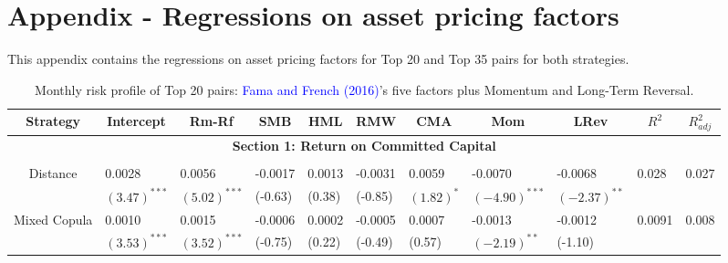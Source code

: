 	\section*{Appendix - Regressions on asset pricing factors}
	
	\vspace{0.6cm}
	
	\setcounter{table}{0}
	\renewcommand{\thetable}{A.\arabic{table}}
	
	
	This appendix contains the regressions on asset pricing factors for Top 20 and Top 35 pairs for both strategies.
	
	\vspace{1.0cm}
	

		\begin{table}[!ht]
		\centering \scriptsize
		\caption{Monthly risk profile of Top 20 pairs: \textcolor{blue}{Fama and French} \textcolor{blue}{(2016)}'s five factors plus Momentum and Long-Term Reversal.}
		\begin{threeparttable}[H]
			\begin{tabularx}{\textwidth}{@{\extracolsep{\fill}} lllllllllll@{}}
				\toprule
				\multicolumn{1}{c}{Strategy} & \multicolumn{1}{c}{Intercept} &  \multicolumn{1}{c}{Rm-Rf} &  \multicolumn{1}{c}{SMB} &  \multicolumn{1}{c}{HML} &  \multicolumn{1}{c}{RMW} &  \multicolumn{1}{c}{CMA} & 
				\multicolumn{1}{c}{Mom} &  \multicolumn{1}{c}{LRev} &  \multicolumn{1}{c}{$R^{2}$} & \multicolumn{1}{c}{$R^{2}_{adj}$} \\
				\midrule
				\multicolumn{11}{c}{\textbf{Section 1: Return on Committed Capital}} \\
				\multicolumn{1}{c}{} & \multicolumn{1}{c}{} & \multicolumn{1}{c}{} & \multicolumn{1}{c}{} & \multicolumn{1}{c}{} & \multicolumn{1}{c}{} & \multicolumn{1}{c}{} & \multicolumn{1}{c}{} & \multicolumn{1}{c}{} & \multicolumn{1}{c}{} & \\
				\multicolumn{1}{c}{Distance} & 0.0028 & 0.0056 & -0.0017 & 0.0013 & -0.0031 & 0.0059 & -0.0070 & -0.0068 & 0.028 & 0.027 \\
				\multicolumn{1}{c}{} & $(3.47)^{***}$ & $(5.02)^{***}$ & (-0.63) & (0.38) & (-0.85) & $(1.82)^{*}$ & $(-4.90)^{***}$ & $(-2.37)^{**}$ & & \\
				\multicolumn{1}{c}{Mixed Copula} & 0.0010 & 0.0015 & -0.0006 & 0.0002 & -0.0005 & 0.0007 & -0.0013 & -0.0012 & 0.0091 & 0.008 \\
				\multicolumn{1}{c}{} & $(3.53)^{***}$ & $(3.52)^{***}$ & (-0.75) & (0.22) & (-0.49) & (0.57) & $(-2.19)^{**}$ & (-1.10) & & \\
				

\end{tabularx}
\end{threeparttable}
\end{table}
